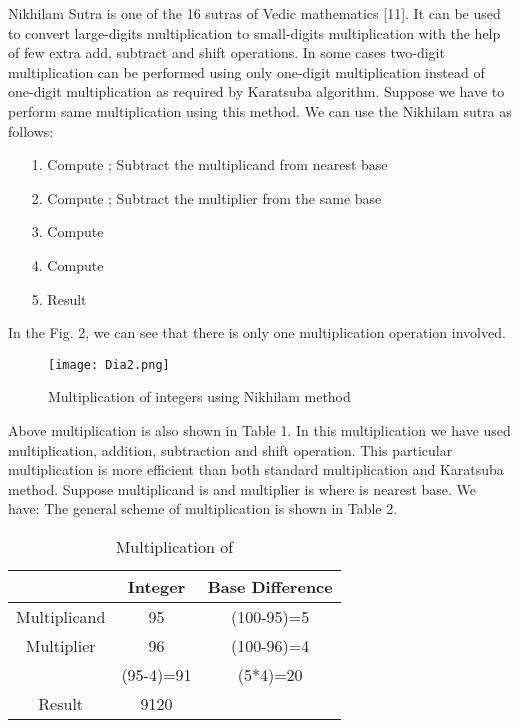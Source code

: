\documentclass[conference]{IEEEtran}
\begin{document}
\indent Nikhilam Sutra is one of the 16 sutras of Vedic mathematics [11]. It can be used to convert large-digits multiplication to small-digits multiplication with the help of few extra add, subtract and shift operations. In some cases two-digit multiplication can be performed using only  one-digit multiplication instead of  one-digit multiplication as required by Karatsuba algorithm.
Suppose we have to perform same multiplication  using this method. We can use the Nikhilam sutra as follows:
\begin{enumerate}
 \item[1.] Compute ; Subtract the multiplicand from nearest base 
 \item[2.] Compute ; Subtract the multiplier from the same base
 \item[3.] Compute 
 \item[4.] Compute  
 \item[5.] Result  
\end{enumerate}

In the Fig. 2, we can see that there is only one multiplication operation involved.
\begin{figure}[ht]
\begin{center}
\texttt{[image: Dia2.png]}
\end{center}
\caption{Multiplication of integers  using Nikhilam method}
\label{graph1}
\end{figure}


Above multiplication is also shown in Table 1. In this multiplication we have used  multiplication,  addition,  subtraction and  shift operation. This particular multiplication is more efficient than both standard multiplication and Karatsuba method. Suppose multiplicand is  and multiplier is  where  is nearest base. We have: 
 The general scheme of multiplication  is shown in Table 2.
\begin{table}[ht]
\renewcommand{\arraystretch}{1.3}
\caption{Multiplication of }
\label{table 1}
\begin{center}
\begin{tabular}{|c| c| c| } 
\hline
 & Integer & Base Difference    \\ [1ex] \hline\hline 
Multiplicand & 95 & (100-95)=5   \\ \hline
Multiplier & 96 & (100-96)=4  \\ \hline
 & (95-4)=91 & (5*4)=20  \\ \hline
Result & 9120 &   \\ [1ex] \hline

\end{tabular} 
\end{center}
\end{table} 
\end{document}
